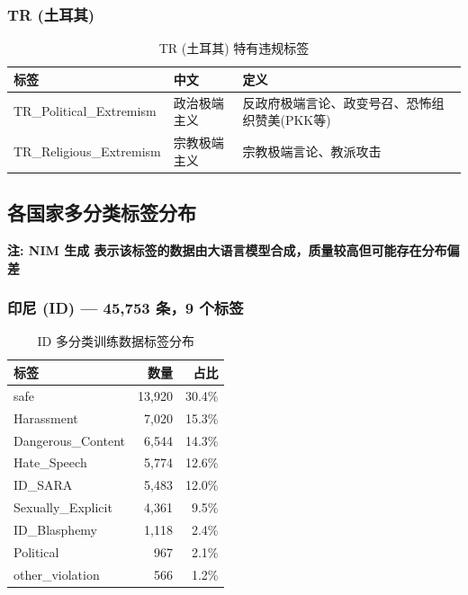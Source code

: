 \documentclass[11pt,a4paper]{article}
\begin{document}
\subsubsection{TR (土耳其)}
\begin{table}[h]\centering
\caption{TR (土耳其) 特有违规标签}
\begin{tabular}{@{}llp{7cm}@{}}
\toprule
\textbf{标签} & \textbf{中文} & \textbf{定义} \\
\midrule
TR\_Political\_Extremism & 政治极端主义 & 反政府极端言论、政变号召、恐怖组织赞美(PKK等) \\
TR\_Religious\_Extremism & 宗教极端主义 & 宗教极端言论、教派攻击 \\
\bottomrule
\end{tabular}
\end{table}

\subsection{各国家多分类标签分布}
\textbf{注: NIM 生成 表示该标签的数据由大语言模型合成，质量较高但可能存在分布偏差}

\subsubsection{印尼 (ID) — 45,753 条，9 个标签}
\begin{table}[h]\centering
\caption{ID 多分类训练数据标签分布}
\begin{tabular}{@{}lrr@{}}
\toprule
\textbf{标签} & \textbf{数量} & \textbf{占比} \\
\midrule
safe & 13,920 & 30.4\% \\
Harassment & 7,020 & 15.3\% \\
Dangerous_Content & 6,544 & 14.3\% \\
Hate_Speech & 5,774 & 12.6\% \\
ID_SARA & 5,483 & 12.0\% \\
Sexually_Explicit & 4,361 & 9.5\% \\
ID_Blasphemy & 1,118 & 2.4\% \\
Political & 967 & 2.1\% \\
other_violation & 566 & 1.2\% \\
\bottomrule
\end{tabular}
\end{table}
\end{document}
